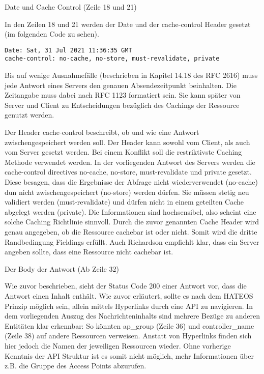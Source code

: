 Date und Cache Control (Zeile 18 und 21)

In den Zeilen 18 und 21 werden der Date und der cache-control Header gesetzt (im folgenden Code zu sehen).

\lstset{firstnumber=13}
\begin{lstlisting}
Date: Sat, 31 Jul 2021 11:36:35 GMT
cache-control: no-cache, no-store, must-revalidate, private
\end{lstlisting}

Bis auf wenige Ausnahmefälle (beschrieben in Kapitel 14.18 des RFC 2616) muss jede Antwort eines Servers den genauen Absendezeitpunkt beinhalten. Die Zeitangabe muss dabei nach RFC 1123 formatiert sein. Sie kann später von Server und Client zu Entscheidungen bezüglich des Cachings der Ressource genutzt werden.

Der Header cache-control beschreibt, ob und wie eine Antwort zwischengespeichert werden soll. Der Header kann sowohl vom Client, als auch vom Server gesetzt werden. Bei einem Konflikt soll die restriktivste Caching Methode verwendet werden. In der vorliegenden Antwort des Servers werden die cache-control directives no-cache, no-store, must-revalidate und private gesetzt. Diese besagen, dass die Ergebnisse der Abfrage nicht wiederverwendet (no-cache) dun nicht zwischengespeichert (no-store) werden dürfen. Sie müssen stetig neu validiert werden (must-revalidate) und dürfen nicht in einem geteilten Cache abgelegt werden (private). Die Informationen sind hochsensibel, also scheint eine solche Caching Richtlinie sinnvoll. Durch die zuvor genannten Cache Header wird genau angegeben, ob die Ressource cachebar ist oder nicht. Somit wird die dritte Randbedingung Fieldings erfüllt. Auch Richardson empfiehlt klar, dass ein Server angeben sollte, dass eine Ressource nicht cachebar ist.

Der Body der Antwort (Ab Zeile 32)

Wie zuvor beschrieben, sieht der Status Code 200 einer Antwort vor, dass die Antwort einen Inhalt enthält. Wie zuvor erläutert, sollte es nach dem HATEOS Prinzip möglich sein, allein mittels Hyperlinks durch eine API zu navigieren. In dem vorliegenden Auszug des Nachrichteninhalts sind mehrere Bezüge zu anderen Entitäten klar erkennbar: So könnten ap\_group (Zeile 36) und controller\_name (Zeile 38) auf andere Ressourcen verweisen. Anstatt von Hyperlinks finden sich hier jedoch die Namen der jeweiligen Ressourcen wieder. Ohne vorherige Kenntnis der API Struktur ist es somit nicht möglich, mehr Informationen über z.B. die Gruppe des Access Points abzurufen.

